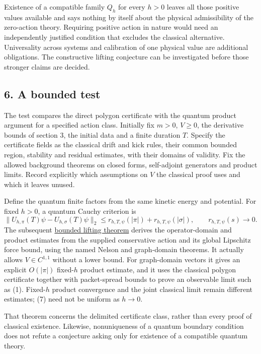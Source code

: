 \documentclass[11pt,a4paper]{article}
\begin{document}
Existence of a compatible family \(Q_h\) for every \(h>0\) leaves all
those positive values available and says nothing by itself about the
physical admissibility of the zero-action theory. Requiring positive
action in nature would need an independently justified condition that
excludes the classical alternative. Universality across systems and
calibration of one physical value are additional obligations. The
constructive lifting conjecture can be investigated before those
stronger claims are decided.

\hypertarget{a-bounded-test}{%
\subsection{6. A bounded test}\label{a-bounded-test}}

The test compares the direct polygon certificate with the quantum
product argument for a specified action class. Initially fix \(m>0\),
\(V\ge0\), the derivative bounds of section 3, the initial data and a
finite duration \(T\). Specify the certificate fields as the classical
drift and kick rules, their common bounded region, stability and
residual estimates, with their domains of validity. Fix the allowed
background theorems on closed forms, self-adjoint generators and product
limits. Record explicitly which assumptions on \(V\) the classical proof
uses and which it leaves unused.

Define the quantum finite factors from the same kinetic energy and
potential. For fixed \(h>0\), a quantum Cauchy criterion is \[
 \|U_{h,\pi}(T)\psi-U_{h,\sigma}(T)\psi\|_2
 \le r_{h,T,\psi}(|\pi|)+r_{h,T,\psi}(|\sigma|),
 \qquad r_{h,T,\psi}(s)\longrightarrow0. \tag{7}
\] The subsequent \href{lipschitz-certificate-quantum-lift.md}{bounded
lifting theorem} derives the operator-domain and product estimates from
the supplied conservative action and its global Lipschitz force bound,
using the named Nelson and graph-domain theorems. It actually allows
\(V\in C^{1,1}\) without a lower bound. For graph-domain vectors it
gives an explicit \(O(|\pi|)\) fixed-\(h\) product estimate, and it uses
the classical polygon certificate together with packet-spread bounds to
prove an observable limit such as (1). Fixed-\(h\) product convergence
and the joint classical limit remain different estimates; (7) need not
be uniform as \(h\to0\).

That theorem concerns the delimited certificate class, rather than every
proof of classical existence. Likewise, nonuniqueness of a quantum
boundary condition does not refute a conjecture asking only for
existence of a compatible quantum theory.
\end{document}
